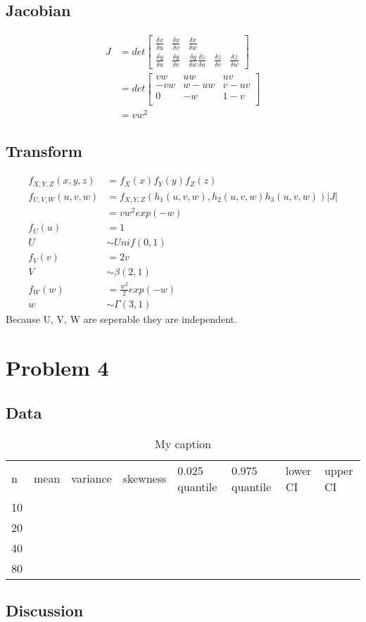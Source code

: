 \documentclass[12pt]{article}
\begin{document}
\subsection{Jacobian}
\begin{align*}
  J &= det\begin{bmatrix}
    \frac{\delta x}{\delta u} & \frac{\delta x}{\delta v} & \frac{\delta x}{\delta w} \\
    \frac{\delta y}{\delta u} & \frac{\delta y}{\delta v} & \frac{\delta y}{\delta w}
    \frac{\delta z}{\delta u} & \frac{\delta z}{\delta v} & \frac{\delta z}{\delta w}
  \end{bmatrix} \\
  &= det\begin{bmatrix}
    vw & uw & uv \\
    -vw & w-uw & v-uv \\
    0 & -w & 1-v \\
  \end{bmatrix} \\
  &= vw^2
\end{align*}

\subsection{Transform}
\begin{align*}
  f_{X,Y,Z}(x,y,z) &= f_X(x)f_Y(y)f_Z(z) \\
  f_{U,V,W}(u,v,w) &= f_{X,Y,Z}(h_1(u,v,w),h_2(u,v,w)h_3(u,v,w))|J| \\
  &= vw^2exp(-w) \\
  f_U(u) &= 1 \\
  U &\sim Unif(0,1) \\
  f_V(v) &= 2v \\
  V &\sim \beta(2,1) \\
  f_W(w) &= \frac{w^2}{2}exp(-w) \\
  w &\sim \Gamma(3,1)
\end{align*}
Because U, V, W are seperable they are independent.

\section{Problem 4}
\subsection{Data}
\begin{table}[]
\centering
\caption{My caption}
\label{my-label}
\begin{tabular}{llllllll}
n  & mean & variance & skewness & 0.025 quantile & 0.975 quantile & lower CI & upper CI \\
10 &      &          &          &                &                &          &          \\
20 &      &          &          &                &                &          &          \\
40 &      &          &          &                &                &          &          \\
80 &      &          &          &                &                &          &         
\end{tabular}
\end{table}
\subsection{Discussion}
\end{document}
